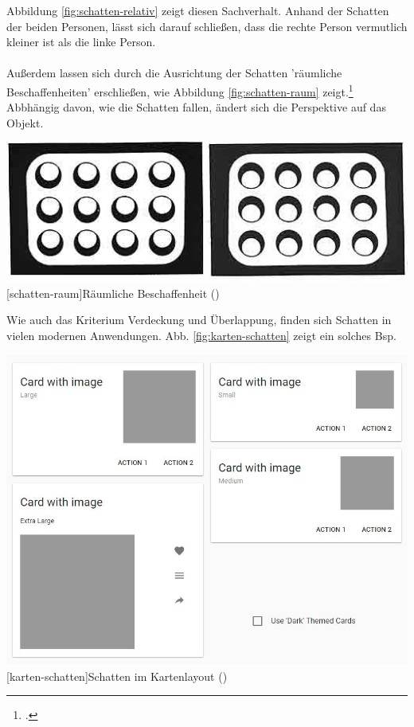 Abbildung \ref{fig:schatten-relativ} zeigt diesen Sachverhalt. Anhand der Schatten der beiden Personen, lässt sich darauf schließen, dass die rechte Person vermutlich kleiner ist als die linke Person.\\
\\
Außerdem lassen sich durch die Ausrichtung der Schatten  'räumliche Beschaffenheiten' erschließen, wie Abbildung \ref{fig:schatten-raum} zeigt.\footcite[Vgl.]{heidXX} Abbhängig davon, wie die Schatten fallen, ändert sich die Perspektive auf das Objekt.

\vspace{1em}
\begin{minipage}{\linewidth}
	\centering
	\includegraphics[width=0.7\linewidth]{images/schatten01.jpg}
	[schatten-raum]{Räumliche Beschaffenheit (\cite{heidXX})}
	\label{fig:schatten-raum}
\end{minipage}
\vspace{1em}

Wie auch das Kriterium Verdeckung und Überlappung, finden sich Schatten in vielen modernen Anwendungen. Abb. \ref{fig:karten-schatten} zeigt ein solches Bsp.

\vspace{1em}
\begin{minipage}{\linewidth}
	\centering
	\includegraphics[width=0.7\linewidth]{images/karten_schatten.jpg}
	[karten-schatten]{Schatten im Kartenlayout (\cite{goo17})}
	\label{fig:karten-schatten}
\end{minipage}
\vspace{1em}

